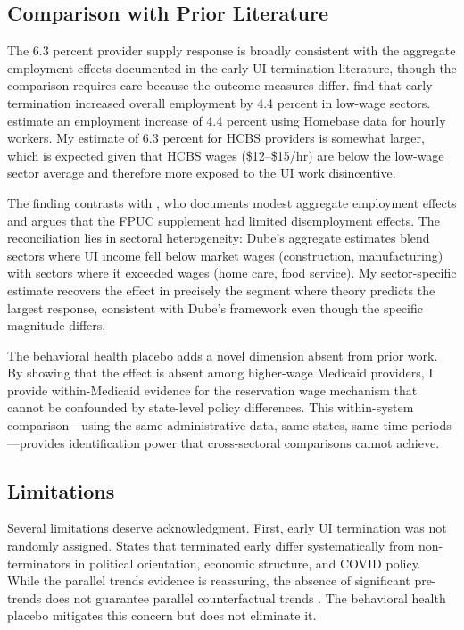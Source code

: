 \documentclass[12pt]{article}
\begin{document}
\subsection{Comparison with Prior Literature}

The 6.3 percent provider supply response is broadly consistent with the aggregate employment effects documented in the early UI termination literature, though the comparison requires care because the outcome measures differ. \citet{holzer2021} find that early termination increased overall employment by 4.4 percent in low-wage sectors. \citet{coombs2022} estimate an employment increase of 4.4 percent using Homebase data for hourly workers. My estimate of 6.3 percent for HCBS providers is somewhat larger, which is expected given that HCBS wages (\$12--\$15/hr) are below the low-wage sector average and therefore more exposed to the UI work disincentive.

The finding contrasts with \citet{dube2021}, who documents modest aggregate employment effects and argues that the FPUC supplement had limited disemployment effects. The reconciliation lies in sectoral heterogeneity: Dube's aggregate estimates blend sectors where UI income fell below market wages (construction, manufacturing) with sectors where it exceeded wages (home care, food service). My sector-specific estimate recovers the effect in precisely the segment where theory predicts the largest response, consistent with Dube's framework even though the specific magnitude differs.

The behavioral health placebo adds a novel dimension absent from prior work. By showing that the effect is absent among higher-wage Medicaid providers, I provide within-Medicaid evidence for the reservation wage mechanism that cannot be confounded by state-level policy differences. This within-system comparison---using the same administrative data, same states, same time periods---provides identification power that cross-sectoral comparisons cannot achieve.

\subsection{Limitations}

Several limitations deserve acknowledgment. First, early UI termination was not randomly assigned. States that terminated early differ systematically from non-terminators in political orientation, economic structure, and COVID policy. While the parallel trends evidence is reassuring, the absence of significant pre-trends does not guarantee parallel counterfactual trends \citep{roth2022}. The behavioral health placebo mitigates this concern but does not eliminate it.
\end{document}
